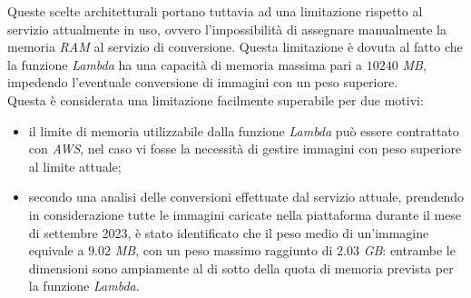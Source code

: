 Queste scelte architetturali portano tuttavia ad una limitazione rispetto al servizio
attualmente in uso, ovvero l'impossibilità di assegnare manualmente la memoria
\emph{RAM} al servizio di conversione. Questa limitazione è dovuta al fatto che
la funzione \emph{Lambda} ha una capacità di memoria massima pari a $10240$
\emph{MB}, impedendo l'eventuale conversione di immagini con un peso
superiore.\\
Questa è considerata una limitazione facilmente superabile per due motivi:
\begin{itemize}
      \item il limite di memoria utilizzabile dalla funzione \emph{Lambda} può essere
            contrattato con \emph{AWS}, nel caso vi fosse la necessità di gestire immagini
            con peso superiore al limite attuale;
      \item secondo una analisi delle conversioni effettuate dal servizio attuale,
            prendendo in considerazione tutte le immagini caricate nella piattaforma
            durante il mese di settembre 2023, è stato identificato che il peso medio di
            un'immagine equivale a $9.02$ \emph{MB}, con un peso massimo raggiunto di $2.03$
            \emph{GB}: entrambe le dimensioni sono ampiamente al di sotto della quota di
            memoria prevista per la funzione \emph{Lambda}.
\end{itemize}


